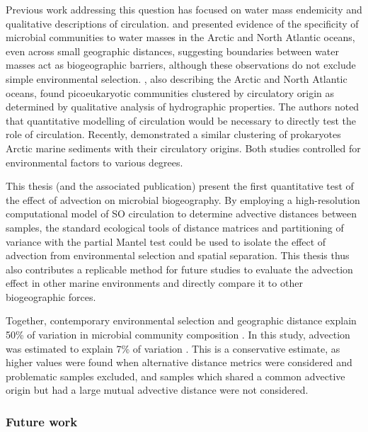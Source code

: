 Previous work addressing this question has focused on water mass endemicity and qualitative descriptions of circulation.
\citet{Galand:2009hy} and \citet{Agogue:2011fm} presented evidence of the specificity of microbial communities to water masses in the Arctic and North Atlantic oceans, even across small geographic distances, suggesting boundaries between water masses act as biogeographic barriers, although these observations do not exclude simple environmental selection.
\citet{Hamilton:2008tp}, also describing the Arctic and North Atlantic oceans, found picoeukaryotic communities clustered by circulatory origin as determined by qualitative analysis of hydrographic properties.
The authors noted that quantitative modelling of circulation would be necessary to directly test the role of circulation.
Recently, \citet{Hamdan:2013ko} demonstrated a similar clustering of prokaryotes Arctic marine sediments with their circulatory origins.
Both studies controlled for environmental factors to various degrees.

This thesis (and the associated publication) present the first quantitative test of the effect of advection on microbial biogeography.
By employing a high-resolution computational model of \ac{SO} circulation to determine advective distances between samples, the standard ecological tools of distance matrices and partitioning of variance with the partial Mantel test could be used to isolate the effect of advection from environmental selection and spatial separation.
This thesis thus also contributes a replicable method for future studies to evaluate the advection effect in other marine environments and directly compare it to other biogeographic forces.



Together, contemporary environmental selection and geographic distance explain \textapprox{} 50\% of variation in microbial community composition \cite{Hanson:2012cb}.
In this study, advection was estimated to explain 7\% of variation .
This is a conservative estimate, as higher values were found when alternative distance metrics were considered and problematic samples excluded, and samples which shared a common advective origin but had a large mutual advective distance were not considered.

\subsubsection{Future work}

